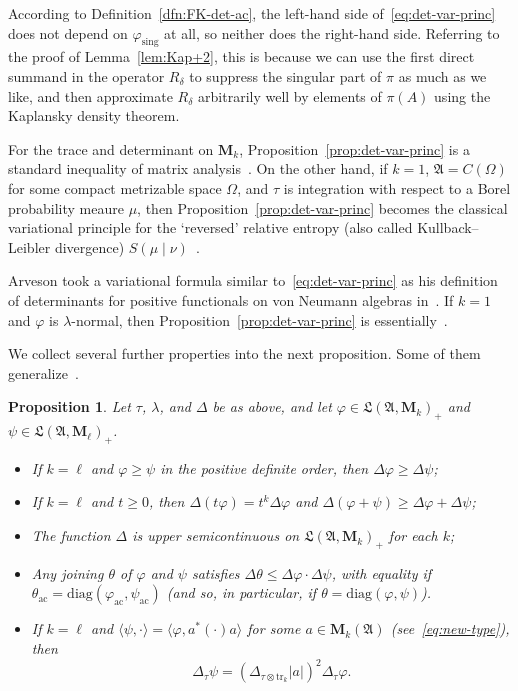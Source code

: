 \documentclass[12pt,a4paper]{article}
\numberwithin{equation}{section}
\newtheorem{prop}[thm]{Proposition}
\theoremstyle{remark}
\renewcommand{\rm}[1]{\mathrm{#1}}
\newcommand{\rmM}{\mathbf{M}}
\newcommand{\A}{\mathfrak{A}}
\newcommand{\frL}{\mathfrak{L}}
\renewcommand{\phi}{\varphi}
\renewcommand{\l}{\lambda}
\newcommand{\Tr}{\mathrm{tr}}
\begin{document}
According to Definition~\ref{dfn:FK-det-ac}, the left-hand side of~\eqref{eq:det-var-princ} does not depend on $\phi_{\rm{sing}}$ at all, so neither does the right-hand side.  Referring to the proof of Lemma~\ref{lem:Kap+2}, this is because we can use the first direct summand in the operator $R_\delta$ to suppress the singular part of $\pi$ as much as we like, and then approximate $R_\delta$ arbitrarily well by elements of $\pi(A)$ using the Kaplansky density theorem.

For the trace and determinant on $\rmM_k$, Proposition~\ref{prop:det-var-princ} is a standard inequality of matrix analysis~\cite[Exer. 7.8.P4]{HorJohMA}.  On the other hand, if $k=1$, $\A = C(\Omega)$ for some compact metrizable space $\Omega$, and $\tau$ is integration with respect to a Borel probability meaure $\mu$, then Proposition~\ref{prop:det-var-princ} becomes the classical variational principle for the `reversed' relative entropy (also called Kullback--Leibler divergence) $S(\mu\mid \nu)$~\cite[Lem. 2.3.3]{SimOPUCI}.

Arveson took a variational formula similar to~\eqref{eq:det-var-princ} as his definition of determinants for positive functionals on von Neumann algebras in~\cite[Def. 4.3.7]{Arv67}.  If $k=1$ and $\phi$ is $\l$-normal, then Proposition~\ref{prop:det-var-princ} is essentially~\cite[Prop. 2.1]{BlecLab06}.

We collect several further properties into the next proposition.  Some of them generalize~\cite[Cor. 4.3.3]{Arv67}.

\begin{prop}\label{prop:det-props}
Let $\tau$, $\l$, and $\Delta$ be as above, and let $\phi \in \frL(\A,\rmM_k)_+$ and $\psi \in \frL(\A,\rmM_\ell)_+$.
\begin{itemize}
\item[a.] If $k=\ell$ and $\phi \ge \psi$ in the positive definite order, then $\Delta\phi \ge \Delta\psi$;
\item[b.] If $k = \ell$ and $t \ge 0$, then $\Delta (t\phi) = t^k\Delta \phi$ and $\Delta (\phi + \psi) \ge \Delta \phi + \Delta \psi$;
\item[c.] The function $\Delta$ is upper semicontinuous on $\frL(\A,\rmM_k)_+$ for each $k$;
\item[d.] Any joining $\theta$ of $\phi$ and $\psi$ satisfies $\Delta \theta \le \Delta \phi\cdot \Delta \psi$, with equality if $\theta_{\rm{ac}} = \rm{diag}(\phi_{\rm{ac}},\psi_{\rm{ac}})$ (and so, in particular, if $\theta = \rm{diag}(\phi,\psi)$).
\item[e.] If $k = \ell$ and $\langle \psi,\cdot\rangle = \langle \phi,a^\ast(\cdot)a\rangle$ for some $a \in \rmM_k(\A)$ (see~\eqref{eq:new-type}), then
\begin{equation}\label{eq:FK-transformation}
\Delta_\tau \psi = (\Delta_{\tau \otimes \Tr_k} |a|)^2\Delta_\tau \phi.
\end{equation}
\end{itemize}
\end{prop}
\end{document}

